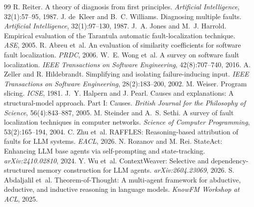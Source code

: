 \documentclass{article}
\begin{document}
\begin{thebibliography}{99}
 R. Reiter. A theory of diagnosis from first principles. \emph{Artificial Intelligence}, 32(1):57--95, 1987.
 J. de~Kleer and B.~C. Williams. Diagnosing multiple faults. \emph{Artificial Intelligence}, 32(1):97--130, 1987.
 J.~A. Jones and M.~J. Harrold. Empirical evaluation of the Tarantula automatic fault-localization technique. \emph{ASE}, 2005.
 R. Abreu et~al. An evaluation of similarity coefficients for software fault localization. \emph{PRDC}, 2006.
 W.~E. Wong et~al. A survey on software fault localization. \emph{IEEE Transactions on Software Engineering}, 42(8):707--740, 2016.
 A. Zeller and R. Hildebrandt. Simplifying and isolating failure-inducing input. \emph{IEEE Transactions on Software Engineering}, 28(2):183--200, 2002.
 M. Weiser. Program slicing. \emph{ICSE}, 1981.
 J.~Y. Halpern and J. Pearl. Causes and explanations: A structural-model approach. Part I: Causes. \emph{British Journal for the Philosophy of Science}, 56(4):843--887, 2005.
 M. Steinder and A.~S. Sethi. A survey of fault localization techniques in computer networks. \emph{Science of Computer Programming}, 53(2):165--194, 2004.
 C. Zhu et~al. RAFFLES: Reasoning-based attribution of faults for LLM systems. \emph{EACL}, 2026.
 N. Rozanov and M. Rei. StateAct: Enhancing LLM base agents via self-prompting and state-tracking. \emph{arXiv:2410.02810}, 2024.
 Y. Wu et~al. ContextWeaver: Selective and dependency-structured memory construction for LLM agents. \emph{arXiv:2604.23069}, 2026.
 S. Abdaljalil et~al. Theorem-of-Thought: A multi-agent framework for abductive, deductive, and inductive reasoning in language models. \emph{KnowFM Workshop at ACL}, 2025.


\end{thebibliography}
\end{document}
